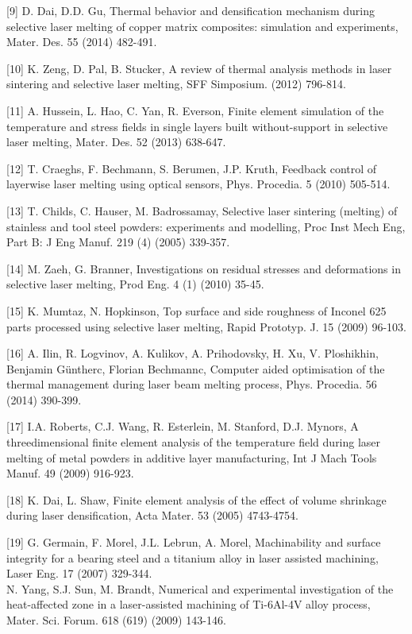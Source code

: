\documentclass[10pt]{article}
\begin{document}
[9] D. Dai, D.D. Gu, Thermal behavior and densification mechanism during selective laser melting of copper matrix composites: simulation and experiments, Mater. Des. 55 (2014) 482-491.

[10] K. Zeng, D. Pal, B. Stucker, A review of thermal analysis methods in laser sintering and selective laser melting, SFF Simposium. (2012) 796-814.

[11] A. Hussein, L. Hao, C. Yan, R. Everson, Finite element simulation of the temperature and stress fields in single layers built without-support in selective laser melting, Mater. Des. 52 (2013) 638-647.

[12] T. Craeghs, F. Bechmann, S. Berumen, J.P. Kruth, Feedback control of layerwise laser melting using optical sensors, Phys. Procedia. 5 (2010) 505-514.

[13] T. Childs, C. Hauser, M. Badrossamay, Selective laser sintering (melting) of stainless and tool steel powders: experiments and modelling, Proc Inst Mech Eng, Part B: J Eng Manuf. 219 (4) (2005) 339-357.

[14] M. Zaeh, G. Branner, Investigations on residual stresses and deformations in selective laser melting, Prod Eng. 4 (1) (2010) 35-45.

[15] K. Mumtaz, N. Hopkinson, Top surface and side roughness of Inconel 625 parts processed using selective laser melting, Rapid Prototyp. J. 15 (2009) 96-103.

[16] A. Ilin, R. Logvinov, A. Kulikov, A. Prihodovsky, H. Xu, V. Ploshikhin, Benjamin Güntherc, Florian Bechmannc, Computer aided optimisation of the thermal management during laser beam melting process, Phys. Procedia. 56 (2014) 390-399.

[17] I.A. Roberts, C.J. Wang, R. Esterlein, M. Stanford, D.J. Mynors, A threedimensional finite element analysis of the temperature field during laser melting of metal powders in additive layer manufacturing, Int J Mach Tools Manuf. 49 (2009) 916-923.

[18] K. Dai, L. Shaw, Finite element analysis of the effect of volume shrinkage during laser densification, Acta Mater. 53 (2005) 4743-4754.

[19] G. Germain, F. Morel, J.L. Lebrun, A. Morel, Machinability and surface integrity for a bearing steel and a titanium alloy in laser assisted machining, Laser Eng. 17 (2007) 329-344.\\
[20] N. Yang, S.J. Sun, M. Brandt, Numerical and experimental investigation of the heat-affected zone in a laser-assisted machining of Ti-6Al-4V alloy process, Mater. Sci. Forum. 618 (619) (2009) 143-146.
\end{document}
